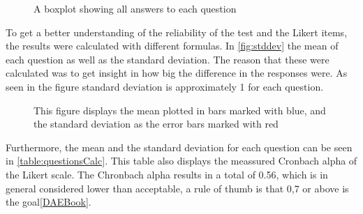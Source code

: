 \begin{figure}[H]
	
	\centering
	\caption{A boxplot showing all answers to each question}
	\label{fig:boxploteval}
\end{figure}

To get a better understanding of the reliability of the test and the Likert items, the results were calculated with different formulas. In \autoref{fig:stddev} the mean of each question as well as the standard deviation. The reason that these were calculated was to get insight in how big the difference in the responses were. As seen in the figure standard deviation
is approximately 1 for each question.
\begin{figure}[H]
	
	\centering
	\caption{This figure displays the mean plotted in bars marked with blue, and the standard deviation as the error bars marked with red}
	\label{fig:stddev}
\end{figure}

Furthermore, the mean and the standard deviation for each question can be seen in \autoref{table:questionsCalc}. This table also displays the meassured Cronbach alpha of the Likert scale. The Chronbach alpha results in a total of 0.56, which is in general considered lower than acceptable, a rule of thumb is that 0,7 or above is the goal\autoref{DAEBook}.

